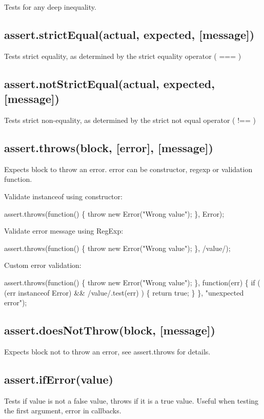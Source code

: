 Tests for any deep inequality.

\subsection*{assert.\+strict\+Equal(actual, expected, \mbox{[}message\mbox{]})}

Tests strict equality, as determined by the strict equality operator ( === )

\subsection*{assert.\+not\+Strict\+Equal(actual, expected, \mbox{[}message\mbox{]})}

Tests strict non-\/equality, as determined by the strict not equal operator ( !== )

\subsection*{assert.\+throws(block, \mbox{[}error\mbox{]}, \mbox{[}message\mbox{]})}

Expects block to throw an error. error can be constructor, regexp or validation function.

Validate instanceof using constructor\+:


\begin{DoxyCode}
assert.throws(function() \{ throw new Error("Wrong value"); \}, Error);
\end{DoxyCode}


Validate error message using Reg\+Exp\+:


\begin{DoxyCode}
assert.throws(function() \{ throw new Error("Wrong value"); \}, /value/);
\end{DoxyCode}


Custom error validation\+:


\begin{DoxyCode}
assert.throws(function() \{
    throw new Error("Wrong value");
\}, function(err) \{
    if ( (err instanceof Error) && /value/.test(err) ) \{
        return true;
    \}
\}, "unexpected error");
\end{DoxyCode}


\subsection*{assert.\+does\+Not\+Throw(block, \mbox{[}message\mbox{]})}

Expects block not to throw an error, see assert.\+throws for details.

\subsection*{assert.\+if\+Error(value)}

Tests if value is not a false value, throws if it is a true value. Useful when testing the first argument, error in callbacks. 